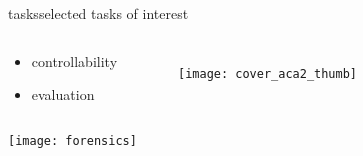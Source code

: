 \begin{frame}{tasks}{selected tasks of interest}
\begin{columns}
\begin{itemize}
\begin{itemize}
                        \item   controllability \cite{pati_attribute-based_2020}
                        \item   evaluation \cite{yang_evaluation_2020, pati_is_2021, watcharasupat_latte_2022, vinay_evaluating_2022}
                    \end{itemize}
            \end{itemize}
            \begin{figure}
                \texttt{[image: cover\_aca2\_thumb]}
            \end{figure}
            \end{columns}
            \vspace{-25mm}
            \begin{flushright}
                \texttt{[image: forensics]}
            \end{flushright}
        \end{frame}
        
